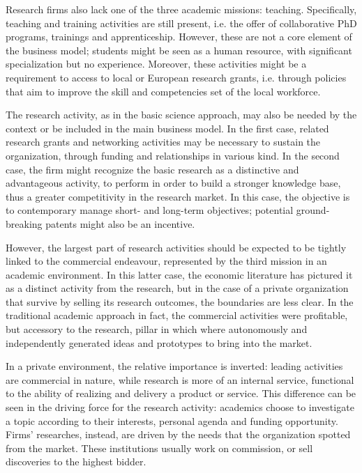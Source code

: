 Research firms also lack one of the three academic missions: teaching. Specifically, teaching and training activities are still present, i.e. the offer of collaborative PhD programs, trainings and apprenticeship. However, these are not a core element of the business model; students might be seen as a human resource, with significant specialization but no experience. Moreover, these activities might be a requirement to access to local or European research grants, i.e. through policies that aim to improve the skill and competencies set of the local workforce. 

The research activity, as in the basic science approach, may also be needed by the context or be included in the main business model. In the first case, related research grants and networking activities may be necessary to sustain the organization, through funding and relationships in various kind. In the second case, the firm might recognize the basic research as a distinctive and advantageous activity, to perform in order to build a stronger knowledge base, thus a greater competitivity in the research market. In this case, the objective is to contemporary manage short- and long-term objectives; potential ground-breaking patents might also be an incentive.

However, the largest part of research activities should be expected to be tightly linked to the commercial endeavour, represented by the third mission in an academic environment. In this latter case, the economic literature has pictured it as a distinct activity from the research, but in the case of a private organization that survive by selling its research outcomes, the boundaries are less clear. In the traditional academic approach in fact, the commercial activities were profitable, but accessory to the research, pillar in which where autonomously and independently generated ideas and prototypes to bring into the market. 

In a private environment, the relative importance is inverted: leading activities are commercial in nature, while research is more of an internal service, functional to the ability of realizing and delivery a product or service. This difference can be seen in the driving force for the research activity: academics choose to investigate a topic according to their interests, personal agenda and funding opportunity. Firms' researches, instead, are driven by the needs that the organization spotted from the market. These institutions usually work on commission, or sell discoveries to the highest bidder. 

